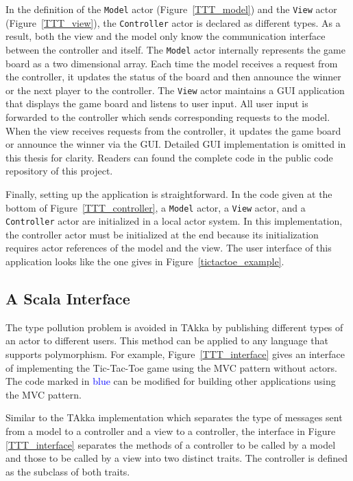 In the definition of the {\tt Model} actor (Figure~\ref{TTT_model}) and the 
{\tt View} actor (Figure~\ref{TTT_view}), the {\tt Controller} actor is declared 
as different types.  As a result, both the view and the model only know the 
communication interface between the controller and itself.  The {\tt Model} 
actor internally represents the game board as a two dimensional array.  Each 
time the model receives a request from the controller, it updates the status of 
the board and then announce the winner or the next player to the controller.  
The {\tt View} actor maintains a GUI application that displays the game board 
and listens to user input.  All user input is forwarded to the controller 
which sends corresponding requests to the model.  When the view receives 
requests from the controller, it updates the game board or announce the winner 
via the GUI.  Detailed GUI implementation is omitted in this thesis for clarity.
Readers can found the complete code in the public code repository of this project. \citep{takka_repo}


Finally, setting up the application is straightforward.  In the code 
given at the bottom of Figure~\ref{TTT_controller}, a {\tt Model} actor, a 
{\tt View} actor, and a {\tt Controller} actor are initialized in a local actor 
system.  In this implementation, the controller actor must be initialized at the 
end because its initialization requires actor references of the model and the 
view.  The user interface of this application looks like the one gives in 
Figure~\ref{tictactoe_example}.  



\subsection{A Scala Interface}
\label{type_pollution_oo}



The type pollution problem is avoided in TAkka by publishing different types of 
an actor to different users.  This method can be applied to any language that 
supports polymorphism.  For example, Figure~\ref{TTT_interface} gives an 
interface of implementing the Tic-Tac-Toe game using the MVC pattern without actors.  The code 
marked in \textcolor{blue}{blue} can be modified for building other 
applications using the MVC pattern.

Similar to the TAkka implementation which separates the type of messages sent 
from a model to a controller and a view to a controller, the interface in Figure 
\ref{TTT_interface} separates the methods of a controller to be called by a 
model and those to be called by a view into two distinct traits.  The controller 
is defined as the subclass of both traits.

